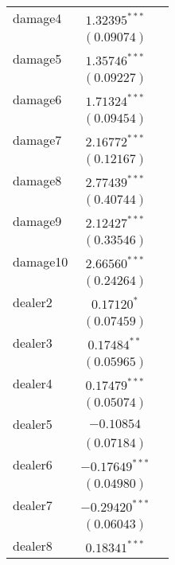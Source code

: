 \begin{table}
\begin{center}
\begin{tabular}{l c c}
damage4          & $1.32395^{***}$  &                  \\
                 & $(0.09074)$      &                  \\
damage5          & $1.35746^{***}$  &                  \\
                 & $(0.09227)$      &                  \\
damage6          & $1.71324^{***}$  &                  \\
                 & $(0.09454)$      &                  \\
damage7          & $2.16772^{***}$  &                  \\
                 & $(0.12167)$      &                  \\
damage8          & $2.77439^{***}$  &                  \\
                 & $(0.40744)$      &                  \\
damage9          & $2.12427^{***}$  &                  \\
                 & $(0.33546)$      &                  \\
damage10         & $2.66560^{***}$  &                  \\
                 & $(0.24264)$      &                  \\
dealer2          & $0.17120^{*}$    &                  \\
                 & $(0.07459)$      &                  \\
dealer3          & $0.17484^{**}$   &                  \\
                 & $(0.05965)$      &                  \\
dealer4          & $0.17479^{***}$  &                  \\
                 & $(0.05074)$      &                  \\
dealer5          & $-0.10854$       &                  \\
                 & $(0.07184)$      &                  \\
dealer6          & $-0.17649^{***}$ &                  \\
                 & $(0.04980)$      &                  \\
dealer7          & $-0.29420^{***}$ &                  \\
                 & $(0.06043)$      &                  \\
dealer8          & $0.18341^{***}$  &                  \\

\end{tabular}
\end{center}
\end{table}
